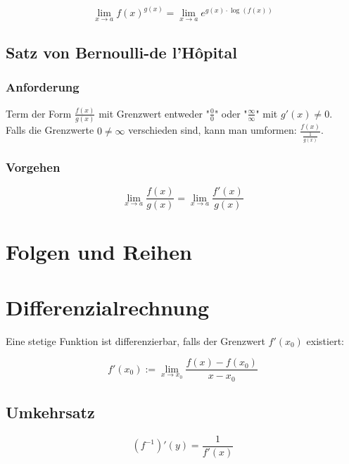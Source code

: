 \documentclass[11pt]{article}
\begin{document}
\begin{equation*}
	\lim_{x\to a}f(x)^{g(x)} = \lim_{x\to a}e^{g(x) \cdot \log(f(x))}
\end{equation*}

\subsection{Satz von Bernoulli-de l'H{\^o}pital}

\subsubsection*{Anforderung}

Term der Form $\frac{f(x)}{g(x)}$ mit Grenzwert entweder "$\frac{0}{0}$" oder "$\frac{\infty}{\infty}$" mit $g'(x) \neq 0$. \\
Falls die Grenzwerte $0 \neq \infty$ verschieden sind, kann man umformen: $\frac{f(x)}{\frac{1}{g(x)}}$.

\subsubsection*{Vorgehen}

\begin{equation*}
	\lim_{x\to a}\frac{f(x)}{g(x)} = \lim_{x\to a}\frac{f'(x)}{g(x)}
\end{equation*}

\section{Folgen und Reihen}

\section{Differenzialrechnung}

Eine stetige Funktion ist differenzierbar, falls der Grenzwert $f'(x_0)$ existiert:

\begin{equation*}
	f'(x_0) := \lim_{x\to x_0}\frac{f(x) - f(x_0)}{x-x_0}
\end{equation*}

\subsection{Umkehrsatz}

\begin{equation*}
	(f^{-1})'(y) = \frac{1}{f'(x)}
\end{equation*}
\end{document}
